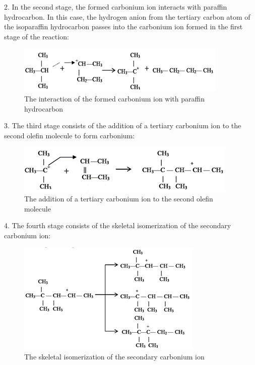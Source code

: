 \documentclass{svproc}
\begin{document}
2. In the second stage, the formed carbonium ion interacts with paraffin hydrocarbon. In this case, the hydrogen anion from the tertiary carbon atom of the isoparaffin hydrocarbon passes into the carbonium ion formed in the first stage of the reaction:

\begin{figure}
\centering
\includegraphics[height=3.3 cm]{fig2.png}
\caption{The interaction of the formed carbonium ion with paraffin hydrocarbon}
\label{fig2}
\end{figure}

3. The third stage consists of the addition of a tertiary carbonium ion to the second olefin molecule to form carbonium:

\begin{figure}
\centering
\includegraphics[height=3.3 cm]{fig3.png}
\caption{The addition of a tertiary carbonium ion to the second olefin molecule}
\label{fig3}
\end{figure}

4. The fourth stage consists of the skeletal isomerization of the secondary carbonium ion:

\begin{figure}
\centering
\includegraphics[height=6.3 cm]{fig4.png}
\caption{The skeletal isomerization of the secondary carbonium ion}
\label{fig4}
\end{figure}
\end{document}
